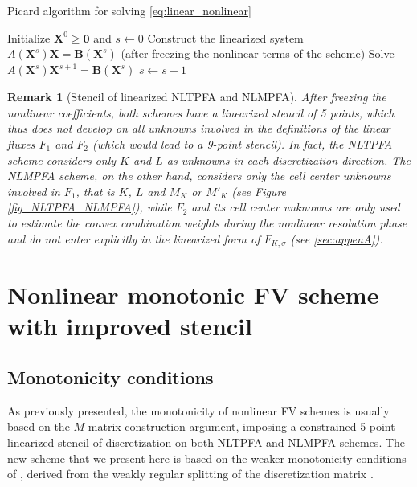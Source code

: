 \documentclass[final,11pt]{elsarticle}
\newtheorem{remark}{Remark}
\begin{document}
\begin{algorithm}[!h]
\caption{Picard algorithm for solving \eqref{eq:linear_nonlinear} \label{algo:picard}}
\begin{algorithmic}[1]
\State Initialize $\boldsymbol{X}^0\geq \boldsymbol{0}$ and $s\leftarrow0$
  \State Construct the linearized system $A(\boldsymbol{X}^s)\boldsymbol{X}=\boldsymbol{B}(\boldsymbol{X}^s)$ (after freezing the nonlinear terms of the scheme)
  \State Solve $A(\boldsymbol{X}^{s})\boldsymbol{X}^{s+1}=\boldsymbol{B}(\boldsymbol{X}^{s})$
    \State $s\leftarrow s+1$
\EndWhile
\end{algorithmic}
\end{algorithm}

\begin{remark}[Stencil of linearized NLTPFA and NLMPFA]\label{rem:stencil}
After freezing the nonlinear coefficients, both schemes have a linearized stencil of 5 points, which thus does not develop on all unknowns involved in the definitions of the linear fluxes $F_1$ and $F_2$ (which would lead to a 9-point stencil). In fact, the NLTPFA scheme considers only $K$ and $L$ as unknowns in each discretization direction. The NLMPFA scheme, on the other hand, considers only the cell center unknowns involved in $F_1$, that is $K$, $L$ and $M_K$ or $M'_K$ (see Figure \ref{fig_NLTPFA_NLMPFA}), while $F_2$ and its cell center unknowns are only used to estimate the convex combination weights during the nonlinear resolution phase and do not enter explicitly in the linearized form of $F_{K,\sigma}$ (see \ref{sec:appenA}).
\end{remark}

\section{Nonlinear monotonic FV scheme with improved stencil}\label{sec:scheme}

\subsection{Monotonicity conditions}

As previously presented, the monotonicity of nonlinear FV schemes is usually based on the $M$-matrix construction argument, imposing a constrained 5-point linearized stencil of discretization on both NLTPFA and NLMPFA schemes. The new scheme that we present here is based on the weaker monotonicity conditions of \cite{nordbotten2007}, derived from the weakly regular splitting of the discretization matrix \cite{berman1994}.
\end{document}
